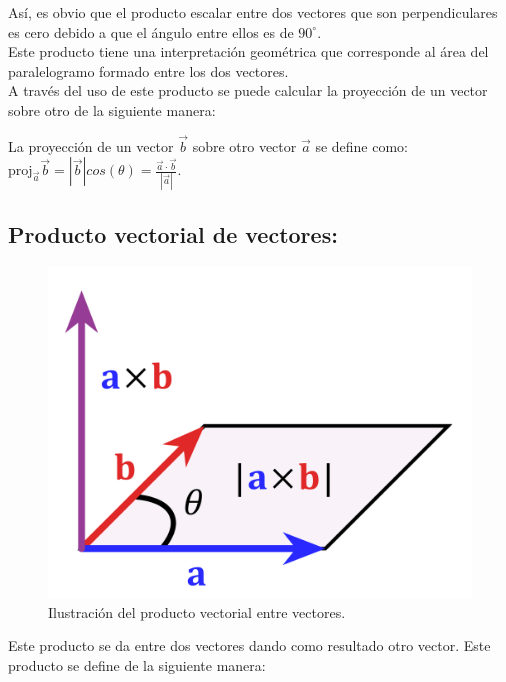 \documentclass[a5paper,pagesize,10pt,bibtotoc,pointlessnumbers,
normalheadings,DIV=9,fleqn,x11names,table,twoside=false]{scrbook}
\begin{document}
Así, es obvio que el producto escalar entre dos vectores que son perpendiculares es cero debido a que el ángulo entre 
ellos es de $90^\circ$.\\

Este producto tiene una interpretación geométrica que corresponde al área del paralelogramo formado entre los dos vectores.\\

A través del uso de este producto se puede calcular la proyección de un vector sobre otro de la siguiente manera:

\begin{tcolorbox}
La proyección de un vector $\vec{b}$ sobre otro vector $\vec{a}$ se define como: $\text{proj}_{\vec{a}}\vec{b} 
=|\vec{b}|cos(\theta)= \frac{\vec{a}\cdot\vec{b}}{|\vec{a}|}$.
\end{tcolorbox}

\subsection{Producto vectorial de vectores:}

\begin{figure}[ht]
 \centering
 \includegraphics[scale=0.1]{images/1200px-Cross_product_parallelogram.png}
 \caption{Ilustración del producto vectorial entre vectores.}
 \label{fig:vectorial}
\end{figure}

Este producto se da entre dos vectores dando como resultado otro vector. Este producto se define de la siguiente manera:
\end{document}
